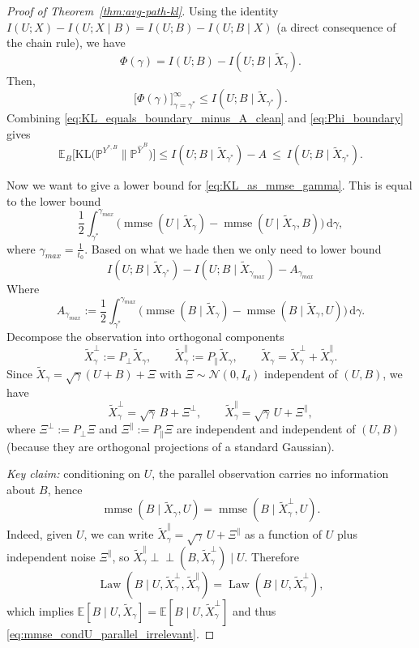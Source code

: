 \documentclass[twoside,11pt]{article}
\DeclareMathOperator{\mmse}{mmse}
\newcommand{\E}{\mathbb{E}}
\newcommand{\PP}{\mathbb{P}}
\newcommand{\Nc}{\mathcal{N}}
\newcommand{\dd}{\mathrm{d}}
\newcommand{\KL}{\mathrm{KL}}
\newcommand{\Law}{\operatorname{Law}}
\numberwithin{equation}{section}
\begin{document}
\begin{proof}[Proof of Theorem~\ref{thm:avg-path-kl}]
Using the identity $I(U;X)-I(U;X\mid B)=I(U;B)-I(U;B\mid X)$ (a direct consequence of the chain rule),
we have
\[
\Phi(\gamma)=I(U;B)-I(U;B\mid \tilde{X}_\gamma).
\]
Then,
\begin{equation}\label{eq:Phi_boundary}
\Big[\Phi(\gamma)\Big]_{\gamma=\gamma^*}^{\infty}
\leq I(U;B\mid \tilde{X}_{\gamma^*}).
\end{equation}
Combining \eqref{eq:KL_equals_boundary_minus_A_clean} and \eqref{eq:Phi_boundary} gives
\begin{equation}\label{eq:KL_upper_clean}
\E_B\!\Big[\KL\!\big(\PP^{Y^{*,B}}\big\|\PP^{\hat Y^{\,B}}\big)\Big]
\leq I(U;B\mid \tilde{X}_{\gamma^*})-A
\ \le\ I(U;B\mid \tilde{X}_{\gamma^*}).
\end{equation}

Now we want to give a lower bound for \eqref{eq:KL_as_mmse_gamma}. This is equal to the lower bound
\begin{equation*}
 \frac12\int_{\gamma^*}^{\gamma_{max}}
\Big(\mmse(U\mid \tilde{X}_\gamma)-\mmse(U\mid \tilde{X}_\gamma,B)\Big)\,\dd\gamma,
\end{equation*}
where $\gamma_{max} = \frac{1}{t_0}$. Based on what we hade then we only need to lower bound 
\begin{equation*}
    I(U;B\mid \tilde{X}_{\gamma^*}) - I(U;B\mid \tilde{X}_{\gamma_{max}}) - A_{\gamma_{max}}
\end{equation*}
Where 
\begin{equation}\label{eq:def_A_clean}
A_{\gamma_{max}}:=\frac12\int_{\gamma^*}^{\gamma_{max}}
\Big(\mmse(B\mid \tilde{X}_\gamma)-\mmse(B\mid \tilde{X}_\gamma,U)\Big)\,\dd\gamma.
\end{equation}
Decompose the observation into orthogonal components
\[
\tilde X_\gamma^\perp := P_\perp \tilde X_\gamma,\qquad
\tilde X_\gamma^\parallel := P_\parallel \tilde X_\gamma,
\qquad \tilde X_\gamma=\tilde X_\gamma^\perp+\tilde X_\gamma^\parallel.
\]
Since $\tilde X_\gamma=\sqrt{\gamma}(U+B)+\Xi$ with $\Xi\sim\Nc(0,I_d)$ independent of $(U,B)$,
we have
\[
\tilde X_\gamma^\perp=\sqrt{\gamma}\,B+\Xi^\perp,\qquad
\tilde X_\gamma^\parallel=\sqrt{\gamma}\,U+\Xi^\parallel,
\]
where $\Xi^\perp:=P_\perp\Xi$ and $\Xi^\parallel:=P_\parallel\Xi$ are independent and independent of $(U,B)$
(because they are orthogonal projections of a standard Gaussian).

\smallskip
\noindent\emph{Key claim:} conditioning on $U$, the parallel observation carries no information about $B$, hence
\begin{equation}\label{eq:mmse_condU_parallel_irrelevant}
\mmse(B\mid \tilde X_\gamma,U)=\mmse(B\mid \tilde X_\gamma^\perp,U).
\end{equation}
Indeed, given $U$, we can write $\tilde X_\gamma^\parallel=\sqrt{\gamma}\,U+\Xi^\parallel$ as a function of $U$
plus independent noise $\Xi^\parallel$, so $\tilde X_\gamma^\parallel\perp\!\!\!\perp (B,\tilde X_\gamma^\perp)\mid U$.
Therefore
\[
\Law(B\mid U,\tilde X_\gamma^\perp,\tilde X_\gamma^\parallel)=\Law(B\mid U,\tilde X_\gamma^\perp),
\]
which implies $\E[B\mid U,\tilde X_\gamma]=\E[B\mid U,\tilde X_\gamma^\perp]$ and thus \eqref{eq:mmse_condU_parallel_irrelevant}.


\end{proof}
\end{document}
